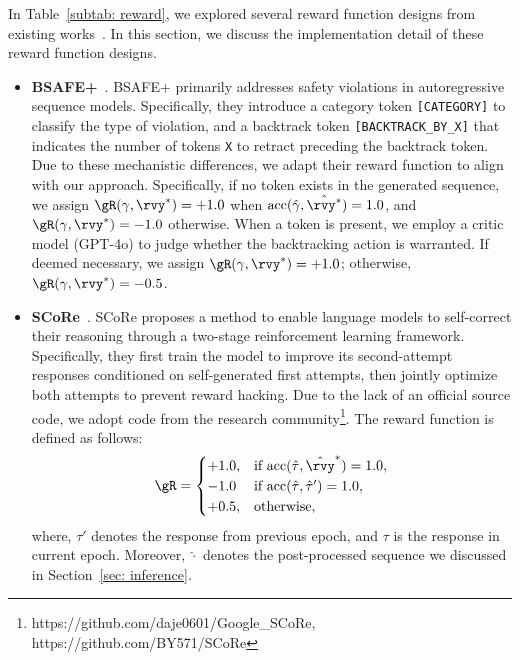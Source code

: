In Table~\ref{subtab: reward}, we explored several reward function designs from existing works~\cite{selreinforcement, kumar2024training, ding2025multi}. 
In this section, we discuss the implementation detail of these reward function designs.
\begin{itemize}[noitemsep, topsep=-1pt, leftmargin=*]
    \item \textbf{BSAFE+}~\cite{selreinforcement}. 
    BSAFE+ primarily addresses safety violations in autoregressive sequence models. Specifically, they introduce a category token \texttt{[CATEGORY]} to classify the type of violation, and a backtrack token \texttt{[BACKTRACK\_BY\_X]} that indicates the number of tokens \texttt{X} to retract preceding the backtrack token.
    Due to these mechanistic differences, we adapt their reward function to align with our approach. Specifically, if no \bk token exists in the generated sequence, we assign $\gR(\gamma, \rvy^*) = +1.0$ when $\text{acc}(\hat{\gamma}, \hat{\rvy^*}) = 1.0$, and $\gR(\gamma, \rvy^*) = -1.0$ otherwise. When a \bk token is present, we employ a critic model (GPT-4o) to judge whether the backtracking action is warranted. If deemed necessary, we assign $\gR(\gamma, \rvy^*) = +1.0$; otherwise, $\gR(\gamma, \rvy^*) = -0.5$.
    \item \textbf{SCoRe}~\cite{kumar2024training}.
    SCoRe proposes a method to enable language models to self-correct their reasoning through a two-stage reinforcement learning framework. 
    Specifically, they first train the model to improve its second-attempt responses conditioned on self-generated first attempts, then jointly optimize both attempts to prevent reward hacking.
    Due to the lack of an official source code, we adopt code from the research community\footnote{https://github.com/daje0601/Google\_SCoRe, https://github.com/BY571/SCoRe}.
    The reward function is defined as follows:
    \begin{equation}
        \gR = \begin{cases}
            +1.0, & \text{if } \text{acc}(\hat{\tau}, \hat{\rvy}^*) = 1.0, \\
            -1.0 &  \text{if } \text{acc}(\hat{\tau}, \hat{\tau}') = 1.0, \\
            +0.5 , & \text{otherwise},
        \end{cases}
    \end{equation}
    where, $\tau'$ denotes the response from previous epoch, and $\tau$ is the response in current epoch. 
    Moreover, $\hat{\cdot}$ denotes the post-processed sequence we discussed in Section~\ref{sec: inference}.

\end{itemize}
